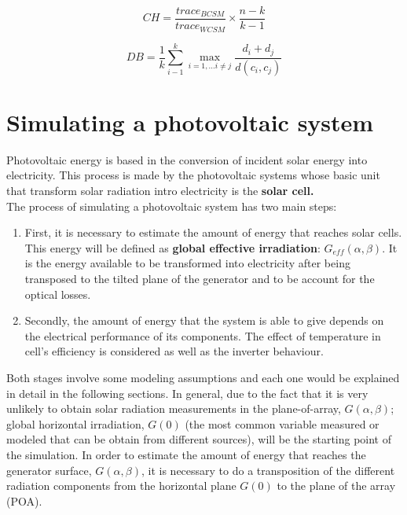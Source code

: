 \begin{equation}\label{eq:calinski}
    CH =\frac{trace_{BCSM}}{trace_{WCSM}}\times\frac{n-k}{k-1}
\end{equation}

\begin{equation}\label{eq:davies}
    DB =\frac{1}{k}\sum_{i-1}^{k}\max_{i=1,...i\neq{j}}{\frac{d_{i}+d_{j}}{d(c_i,c_j)}}
\end{equation}

\section{Simulating a photovoltaic system}

Photovoltaic energy is based in the conversion of incident solar energy into electricity. This process is made by the photovoltaic systems whose basic unit that transform solar radiation intro electricity is the \textbf{solar cell.}\\

The process of simulating a photovoltaic system has two main steps:

\begin{enumerate}
\item First, it is necessary to estimate the amount of energy that reaches solar cells. This energy will be defined as \textbf{global effective irradiation}: $G_{eff}(\alpha, \beta)$. It is the energy available to be transformed into electricity after being transposed to the tilted plane of the generator and to be account for the optical losses.
  \item Secondly, the amount of energy that the system is able to give depends on the electrical performance of its components. The effect of temperature in cell's efficiency is considered as well as the inverter behaviour.
  \end{enumerate}
  
Both stages involve some modeling assumptions and each one would be explained in detail in the following sections. In general, due to the fact that it is very unlikely to obtain solar radiation measurements in the plane-of-array, $G(\alpha, \beta)$; global horizontal irradiation, $G(0)$ (the most common variable measured or modeled that can be obtain from different sources), will be the starting point of the simulation. In order to estimate the amount of energy that reaches the generator surface, $G(\alpha, \beta)$, it is necessary to do a transposition of the different radiation components from the horizontal plane $G(0)$ to the plane of the array (POA).

